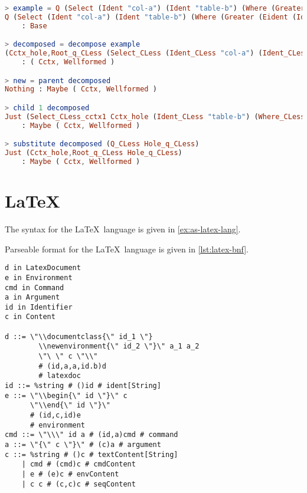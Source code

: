 \begin{lstlisting}[style=inline, language=elm, caption={Elm REPL demonstration of the SQL editor}, label={lst:SQL-repl}]
> example = Q (Select (Ident "col-a") (Ident "table-b") (Where (Greater (Eident (Ident "col-a")) (Econst (Num 2)))))
Q (Select (Ident "col-a") (Ident "table-b") (Where (Greater (Eident (Ident "col-a")) (Econst (Num 2)))))
    : Base

> decomposed = decompose example
(Cctx_hole,Root_q_CLess (Select_CLess (Ident_CLess "col-a") (Ident_CLess "table-b") (Where_CLess (Greater_CLess (Eident_CLess (Ident_CLess "col-a")) (Econst_CLess (Num_CLess 2))))))
    : ( Cctx, Wellformed )

> new = parent decomposed
Nothing : Maybe ( Cctx, Wellformed )

> child 1 decomposed
Just (Select_CLess_cctx1 Cctx_hole (Ident_CLess "table-b") (Where_CLess (Greater_CLess (Eident_CLess (Ident_CLess "col-a")) (Econst_CLess (Num_CLess 2)))),Root_id_CLess (Ident_CLess "col-a"))
    : Maybe ( Cctx, Wellformed )

> substitute decomposed (Q_CLess Hole_q_CLess)
Just (Cctx_hole,Root_q_CLess Hole_q_CLess)
    : Maybe ( Cctx, Wellformed )
\end{lstlisting}

\section{\LaTeX}

The syntax for the \LaTeX \ language is given in \cref{ex:as-latex-lang}.

Parseable format for the \LaTeX \ language is given in \cref{lst:latex-bnf}.

\begin{lstlisting}[style=inline, caption={Parseable format of \LaTeX \ language syntax}, label={lst:latex-bnf}]
d in LatexDocument
e in Environment
cmd in Command
a in Argument
id in Identifier
c in Content

d ::= \"\\documentclass{\" id_1 \"}
        \\newenvironment{\" id_2 \"}\" a_1 a_2 
        \"\ \" c \"\\" 
        # (id,a,a,id.b)d 
        # latexdoc
id ::= %string # ()id # ident[String]
e ::= \"\\begin{\" id \"}\" c 
      \"\\end{\" id \"}\" 
      # (id,c,id)e 
      # environment
cmd ::= \"\\\" id a # (id,a)cmd # command
a ::= \"{\" c \"}\" # (c)a # argument
c ::= %string # ()c # textContent[String] 
    | cmd # (cmd)c # cmdContent 
    | e # (e)c # envContent 
    | c c # (c,c)c # seqContent
    
    
\end{lstlisting}

